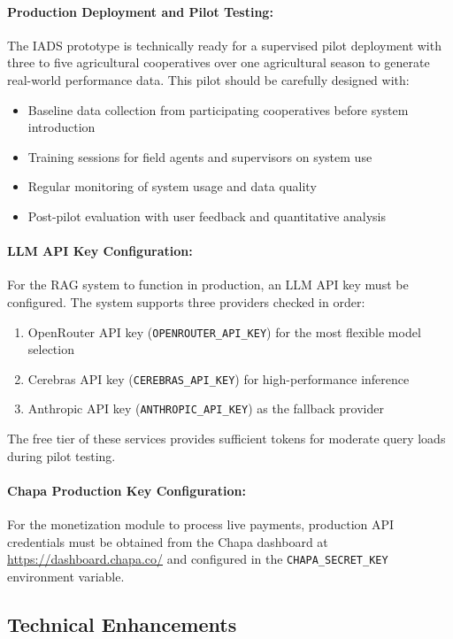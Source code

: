 \paragraph{Production Deployment and Pilot Testing:}
The IADS prototype is technically ready for a supervised pilot deployment with three to five agricultural cooperatives over one agricultural season to generate real-world performance data. This pilot should be carefully designed with:
\begin{itemize}
  \item Baseline data collection from participating cooperatives before system introduction
  \item Training sessions for field agents and supervisors on system use
  \item Regular monitoring of system usage and data quality
  \item Post-pilot evaluation with user feedback and quantitative analysis
\end{itemize}

\paragraph{LLM API Key Configuration:}
For the RAG system to function in production, an LLM API key must be configured. The system supports three providers checked in order:
\begin{enumerate}
  \item OpenRouter API key (\texttt{OPENROUTER\_API\_KEY}) for the most flexible model selection
  \item Cerebras API key (\texttt{CEREBRAS\_API\_KEY}) for high-performance inference
  \item Anthropic API key (\texttt{ANTHROPIC\_API\_KEY}) as the fallback provider
\end{enumerate}
The free tier of these services provides sufficient tokens for moderate query loads during pilot testing.

\paragraph{Chapa Production Key Configuration:}
For the monetization module to process live payments, production API credentials must be obtained from the Chapa dashboard at \url{https://dashboard.chapa.co/} and configured in the \texttt{CHAPA\_SECRET\_KEY} environment variable.

\subsection{Technical Enhancements}

